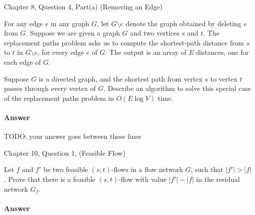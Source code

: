 \documentclass{article}
\begin{document}


\nextprob
{}

Chapter 8, Question 4, Part(a) (Removing an Edge)

For any edge $e$ in any graph $G$, let $G \setminus e$ denote the graph obtained by deleting $e$ from $G$.
Suppose we are given a graph $G$ and two vertices $s$ and $t$.
The replacement paths problem asks us to compute the shortest-path distance from $s$ to $t$ in $G \setminus e$, for every edge $e$ of $G$.
The output is an array of $E$ distances, one for each edge of $G$.

Suppose $G$ is a directed graph, and the shortest path from vertex $s$ to vertex $t$ passes through every vertex of $G$.
Describe an algorithm to solve this special case of the replacement paths problem in $O(E \log V)$ time.

\paragraph{Answer}


TODO: your answer goes between these lines


\nextprob
{}

Chapter 10, Question 1, (Feasible Flow)

Let $f$ and $f'$ be two feasible $(s, t)$-flows in a flow network $G$, such that $|f'| > |f|$.
Prove that there is a feasible $(s, t)$-flow with value $|f'| - |f|$ in the residual network $G_f$.

\paragraph{Answer}

\end{document}
